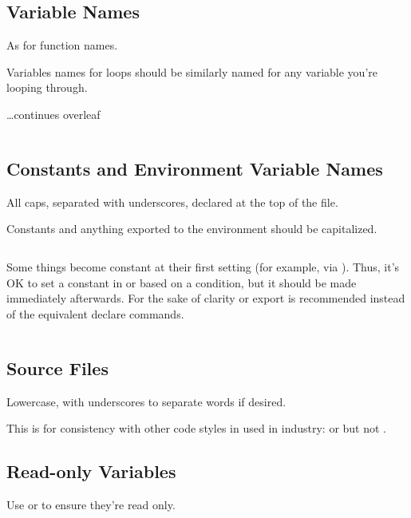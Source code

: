 \documentclass{article}
\begin{document}
\subsection{Variable Names}
\label{subsec:var_names}
As for function names.

Variables names for loops should be similarly named for any variable you’re looping through.

\begin{center}
\vspace{1em}
\ldots continues overleaf    
\end{center}

\inputminted[frame=single,firstline=428, lastline=430, linenos]{bash}{./styleguide.bash}

\subsection{Constants and Environment Variable Names}
\label{subsec:con_env_names}
All caps, separated with underscores, declared at the top of the file.

Constants and anything exported to the environment should be capitalized.

\inputminted[frame=single,firstline=432, lastline=436, linenos]{bash}{./styleguide.bash}

Some things become constant at their first setting (for example, via ). Thus, it’s OK to set a constant in  or based on a condition, but it should be made  immediately afterwards. For the sake of clarity  or export is recommended instead of the equivalent declare commands.

\inputminted[frame=single,firstline=438, lastline=444, linenos]{bash}{./styleguide.bash}

\subsection{Source Files}
\label{subsec:source_fles}
Lowercase, with underscores to separate words if desired.

This is for consistency with other code styles in used in industry:  or  but not .

\subsection{Read-only Variables}
\label{subsec:read_var}
Use  or  to ensure they’re read only.
\end{document}
